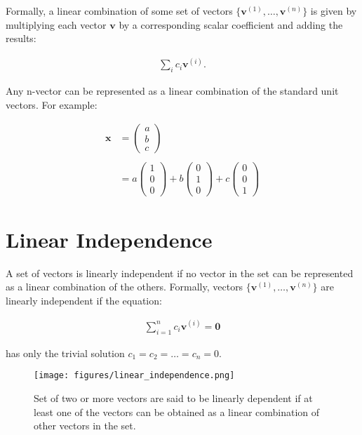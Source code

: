 \documentclass[12pt]{article}
\begin{document}
Formally, a linear combination of some set of vectors $\{\mathbf{v}^{(1)},\ldots, \mathbf{v}^{(n)} \}$ is given by multiplying each vector $\mathbf{v}$ by a corresponding scalar coefficient and adding the results:

\begin{align}
\sum_{i}{c}_{i}\mathbf{v}^{(i)}.
\end{align}

Any n-vector can be represented as a linear combination of the standard unit vectors. For example:

\begin{align}
\mathbf{x} &= \begin{pmatrix}a\\ b\\ c\end{pmatrix} \\ \\
&= a\begin{pmatrix}1\\ 0\\ 0\end{pmatrix}+b\begin{pmatrix}0\\ 1\\ 0\end{pmatrix}+c\begin{pmatrix}0\\ 0\\ 1\end{pmatrix}
\end{align}

\section{Linear Independence}

A set of vectors is linearly independent if no vector in the set can be represented as a linear combination of the others. Formally, vectors $\{\mathbf{v}^{(1)},\ldots, \mathbf{v}^{(n)} \}$ are linearly independent if the equation:

\begin{align}
\sum_{i=1}^n c_i\mathbf{v}^{(i)} = \mathbf{0}
\end{align}

has only the trivial solution $c_1 = c_2 = \dots = c_n = 0$.

\begin{figure}[h]
\centering
\texttt{[image: figures/linear\_independence.png]}
\caption{Set of two or more vectors are said to be linearly dependent if at least one of the vectors can be obtained as a linear combination of other vectors in the set.}
\label{fig:linear_independence}
\end{figure}
\end{document}
